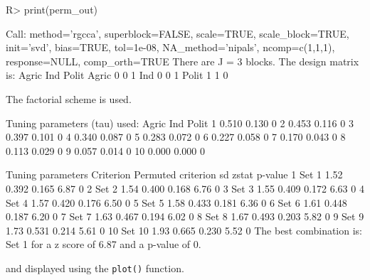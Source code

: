 \documentclass[
]{jss}
\begin{document}
\footnotesize

\begin{CodeChunk}
\begin{CodeInput}
R> print(perm_out)
\end{CodeInput}
\begin{CodeOutput}
Call: method='rgcca', superblock=FALSE, scale=TRUE, scale_block=TRUE, init='svd',
bias=TRUE, tol=1e-08, NA_method='nipals', ncomp=c(1,1,1), response=NULL,
comp_orth=TRUE 
There are J = 3 blocks.
The design matrix is:
      Agric Ind Polit
Agric     0   0     1
Ind       0   0     1
Polit     1   1     0

The factorial scheme is used.

Tuning parameters (tau) used: 
   Agric   Ind Polit
1  0.510 0.130     0
2  0.453 0.116     0
3  0.397 0.101     0
4  0.340 0.087     0
5  0.283 0.072     0
6  0.227 0.058     0
7  0.170 0.043     0
8  0.113 0.029     0
9  0.057 0.014     0
10 0.000 0.000     0

   Tuning parameters Criterion Permuted criterion    sd zstat p-value
1              Set 1      1.52              0.392 0.165  6.87       0
2              Set 2      1.54              0.400 0.168  6.76       0
3              Set 3      1.55              0.409 0.172  6.63       0
4              Set 4      1.57              0.420 0.176  6.50       0
5              Set 5      1.58              0.433 0.181  6.36       0
6              Set 6      1.61              0.448 0.187  6.20       0
7              Set 7      1.63              0.467 0.194  6.02       0
8              Set 8      1.67              0.493 0.203  5.82       0
9              Set 9      1.73              0.531 0.214  5.61       0
10            Set 10      1.93              0.665 0.230  5.52       0
The best combination is: Set 1 for a z score of 6.87 and a p-value of 0.
\end{CodeOutput}
\end{CodeChunk}

\normalsize

and displayed using the \texttt{plot()} function.

\footnotesize
\end{document}
